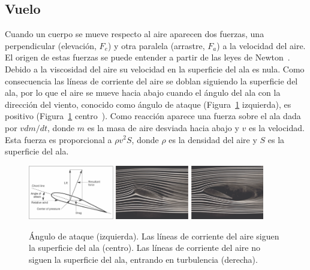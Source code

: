 \documentclass[11pt]{articulo}
\begin{document}
\subsection{Vuelo}

Cuando un cuerpo se mueve respecto al aire aparecen dos fuerzas, una perpendicular (elevaci\'on, $F_e$) y otra paralela (arrastre, $F_a$) a la velocidad del aire. El origen de estas fuerzas se puede entender a partir de las leyes de Newton~\cite{anderson}. Debido a la viscosidad del aire su velocidad en la superficie del ala es nula. Como consecuencia las l\'ineas de corriente del aire se doblan siguiendo la superficie del ala, por lo que el aire se mueve hacia abajo cuando el \'angulo del ala con la direcci\'on del viento, conocido como \'angulo de ataque (Figura~\ref{aerofoil} izquierda), es positivo (Figura~\ref{aerofoil} centro~\cite{babinsky}). Como reacci\'on aparece una fuerza sobre el ala dada por $vdm/dt$, donde $m$ es la masa de aire desviada hacia abajo y $v$ es la velocidad. Esta fuerza es proporcional a $\rho v^2S$, donde $\rho$ es la densidad del aire y $S$ es la superficie del ala.

\begin{figure}[htb]
\begin{center}
\hspace*{0.0cm}
\includegraphics[width=0.332\textwidth]{figuras/aerodinamica_Figura_1a.jpg}
\includegraphics[width=0.284\textwidth]{figuras/aerodinamica_Figura_1b.png}
\includegraphics[width=0.284\textwidth]{figuras/aerodinamica_Figura_1c.png}
\end{center}
\vspace*{-0.6cm}
\caption[]{\label{aerofoil}{\'Angulo de ataque (izquierda). Las l\'ineas de corriente del aire siguen la superficie del ala (centro). Las l\'ineas de corriente del aire no siguen la superficie del ala, entrando en turbulencia (derecha).}}
\end{figure}
\end{document}

